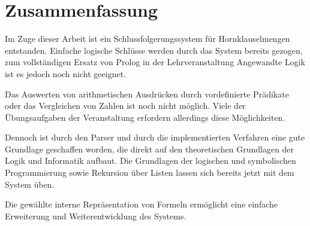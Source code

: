 \chapter{Zusammenfassung}
Im Zuge dieser Arbeit ist ein Schlussfolgerungssystem für Hornklauselmengen entstanden. Einfache logische Schlüsse werden durch das System bereits gezogen, zum vollständigen Ersatz von Prolog in der Lehrveranstaltung Angewandte Logik ist es jedoch noch nicht geeignet.

Das Auswerten von arithmetischen Ausdrücken durch vordefinierte Prädikate oder das Vergleichen von Zahlen ist noch nicht möglich. Viele der Übungsaufgaben der Veranstaltung erfordern allerdings diese Möglichkeiten.

Dennoch ist durch den Parser und durch die implementierten Verfahren eine gute Grundlage geschaffen worden, die direkt auf den theoretischen Grundlagen der Logik und Informatik aufbaut. Die Grundlagen der logischen und symbolischen Programmierung sowie Rekursion über Listen lassen sich bereits jetzt mit dem System üben.

Die gewählte interne Repräsentation von Formeln ermöglicht eine einfache Erweiterung und Weiterentwicklung des Systems.

